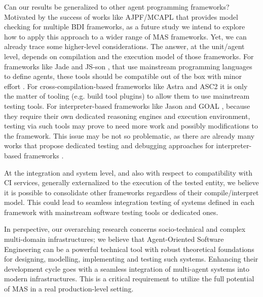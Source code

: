 Can our results be generalized to other agent programming frameworks?
Motivated by the success of works like AJPF/MCAPL \cite{Dennis2016} that provides model checking for multiple BDI frameworks, as a future study we intend to explore how to apply this approach to a wider range of MAS frameworks.
Yet, we can already trace some higher-level considerations.
The answer, at the unit/agent level, depends on compilation and the execution model of those frameworks. For frameworks like Jade and JS-son \cite{Kampik2020}, that use mainstream programming languages to define agents, these tools should be compatible out of the box with minor effort \cite{Khamis2013}. For cross-compilation-based frameworks like Astra \cite{Astra} and ASC2 \cite{MohajeriParizi2020} it is only the matter of tooling (e.g. build tool plugins) to allow them to use mainstream testing tools. For interpreter-based frameworks like Jason \cite{Bordini2005} and GOAL \cite{Hindriks2009a}, because they require their own dedicated reasoning engines and execution environment, %
testing via such tools may prove to need more work and possibly modifications to the framework. This issue may be not so problematic, as there are already many works that propose dedicated testing and debugging approaches for interpreter-based frameworks \cite{Koeman2016}.

At the integration and system level, and also with respect to compatibility with CI services, generally externalized to the execution of the tested entity, we believe it is possible to consolidate other frameworks regardless of their compile/interpret model. This could lead to seamless integration testing of systems defined in each framework with mainstream software testing tools or dedicated ones.

In perspective, our overarching research concerns socio-technical and complex multi-domain infrastructures; we believe that Agent-Oriented Software Engineering can be a powerful technical tool with robust theoretical foundations for designing, modelling, implementing and testing such systems.  Enhancing their development cycle goes with a seamless integration of multi-agent systems into modern infrastructures. This is a critical requirement to utilize the full potential of MAS in a real production-level setting. 
